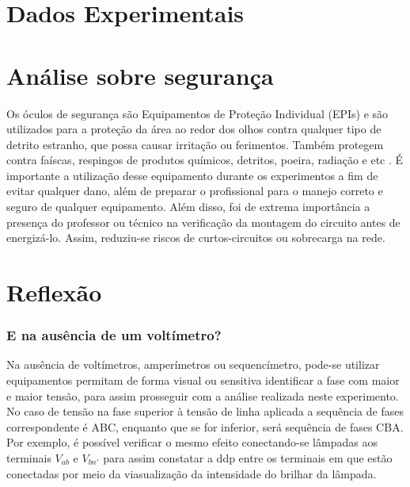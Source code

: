 \documentclass[a4paper,12pt,oneside,openany,table,xcdraw]{article}
\begin{document}
\subsubsection{}


\newpage
\section{Dados Experimentais} \label{dados}

\section{Análise sobre segurança} %
Os óculos de segurança são Equipamentos de Proteção Individual (EPIs) e são utilizados para a proteção da área ao redor dos olhos contra qualquer tipo de detrito estranho, que possa causar irritação ou ferimentos. Também protegem contra faíscas, respingos de produtos químicos, detritos, poeira, radiação e etc \cite{safe}.
É importante a utilização desse equipamento durante os experimentos a fim de evitar qualquer dano, além de preparar o profissional para o manejo correto e seguro de qualquer equipamento.
Além disso, foi de extrema importância a presença do professor ou técnico na verificação da montagem do circuito antes de energizá-lo. Assim, reduziu-se riscos de curtos-circuitos ou sobrecarga na rede.

\vspace{0.2cm}
\section{Reflexão} %
\subsubsection{E na ausência de um voltímetro?}
 Na ausência de voltímetros, amperímetros ou sequencímetro, pode-se utilizar equipamentos permitam de forma visual ou sensitiva identificar a fase com maior e maior tensão, para assim prosseguir com a análise realizada neste experimento. No caso de tensão na fase superior à tensão de linha aplicada a sequência de fases correspondente é ABC, enquanto que se for inferior, será sequência de fases CBA.
 Por exemplo, é possível verificar o mesmo efeito conectando-se lâmpadas aos terminais $V_{ab}$ e $V_{bn'}$ para assim constatar a ddp entre os terminais em que estão conectadas por meio da viasualização da intensidade do brilhar da lâmpada.
 
\end{document}
